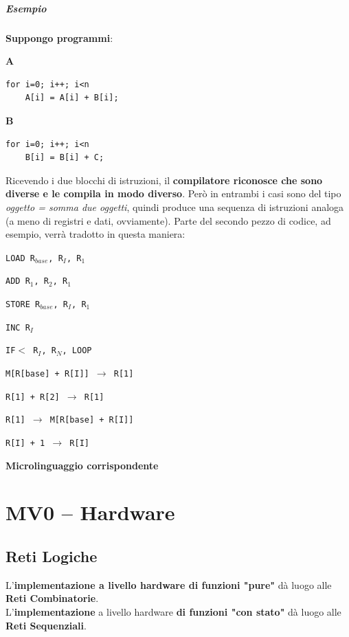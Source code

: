 \documentclass[10pt]{report}
\begin{document}
\paragraph{Esempio} \textbf{Suppongo programmi}:\\
\begin{center}
	\begin{multicols}{2}
	\textbf{A}
	\begin{verbatim}
for i=0; i++; i<n
    A[i] = A[i] + B[i];
	\end{verbatim}

	\columnbreak
	\textbf{B}
	\begin{verbatim}
for i=0; i++; i<n
    B[i] = B[i] + C;
	\end{verbatim}
	\end{multicols}
\end{center}
Ricevendo i due blocchi di istruzioni, il \textbf{compilatore riconosce che sono diverse e le compila in modo diverso}. Però in entrambi i casi sono del tipo \textit{oggetto = somma due oggetti}, quindi produce una sequenza di istruzioni analoga (a meno di registri e dati, ovviamente).
Parte del secondo pezzo di codice, ad esempio, verrà tradotto in questa maniera:
\begin{multicols}{2}
\begin{list}{}{}
\item \texttt{LOAD R$_{base}$, R$_{I}$, R$_{1}$}
\item \texttt{ADD R$_{1}$, R$_{2}$, R$_{1}$}
\item \texttt{STORE R$_{base}$, R$_{I}$, R$_{1}$}
\item \texttt{INC R$_{I}$}
\item \texttt{IF$<$ R$_{I}$, R$_{N}$, LOOP}
\end{list}
\columnbreak
\begin{list}{}{}
\item \texttt{M[R[base] + R[I]] $\rightarrow$ R[1]}
\item \texttt{R[1] + R[2] $\rightarrow$ R[1]}
\item \texttt{R[1]  $\rightarrow$ M[R[base] + R[I]]}
\item \texttt{R[I] + 1 $\rightarrow$ R[I]}
\end{list}
\textbf{Microlinguaggio corrispondente}
\end{multicols}
\chapter{MV0 -- Hardware}
\section{Reti Logiche}
L'\textbf{implementazione a livello hardware di funzioni "pure"} dà luogo alle \textbf{Reti Combinatorie}.\\
L'\textbf{implementazione} a livello hardware \textbf{di funzioni "con stato"} dà luogo alle \textbf{Reti Sequenziali}.
\end{document}

